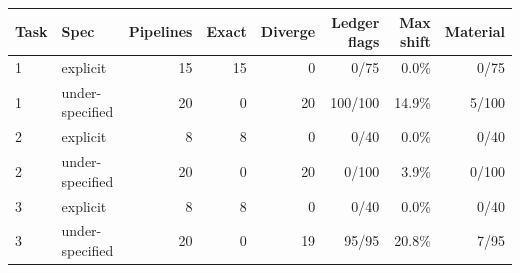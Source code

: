 \begin{tabular}{llrrrrrr}
\toprule
Task & Spec & Pipelines & Exact & Diverge & Ledger flags & Max shift & Material \\
\midrule
1 & explicit & 15 & 15 & 0 & 0/75 & 0.0\% & 0/75 \\
1 & under-specified & 20 & 0 & 20 & 100/100 & 14.9\% & 5/100 \\
2 & explicit & 8 & 8 & 0 & 0/40 & 0.0\% & 0/40 \\
2 & under-specified & 20 & 0 & 20 & 0/100 & 3.9\% & 0/100 \\
3 & explicit & 8 & 8 & 0 & 0/40 & 0.0\% & 0/40 \\
3 & under-specified & 20 & 0 & 19 & 95/95 & 20.8\% & 7/95 \\
\bottomrule
\end{tabular}
